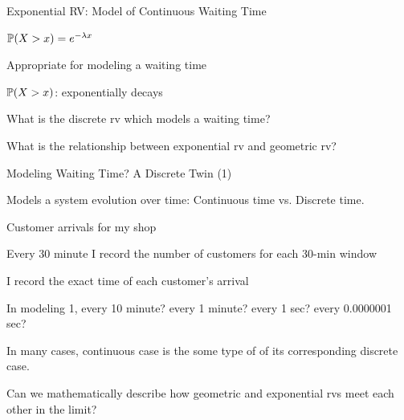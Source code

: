 \begin{frame}{Exponential RV: Model of Continuous Waiting Time}

\plitemsep 0.2in
\bci
\item<1-> $\mathbb{P}( X > x ) = e^{-\lambda x}$
\item<2-> Appropriate for modeling a waiting time
\bci
\item $\mathbb{P}( X > x )$: exponentially decays
\eci

\item<3->  What is the discrete rv which models a waiting time?  

\item<4-> What is the relationship between exponential rv and geometric rv?

\eci


\end{frame}

\begin{frame}{Modeling Waiting Time? A Discrete Twin (1)}

\plitemsep 0.05in
\bci

\item<1-> Models a system evolution over time: Continuous time vs. Discrete time.
\bci
\item<2-> \exam Customer arrivals for my shop
\item<2->  Every 30 minute I record the number of customers for each 30-min window
\item<2->  I record the exact time of each customer's arrival
\item<3-> In modeling 1, every 10 minute? every 1 minute? every 1 sec? every 0.0000001 sec?
\eci

\item<4-> In many cases, continuous case is the some type of  of its corresponding discrete case.


\item<5-> Can we mathematically describe how geometric and exponential rvs meet each other in the limit?

\eci
\end{frame}

